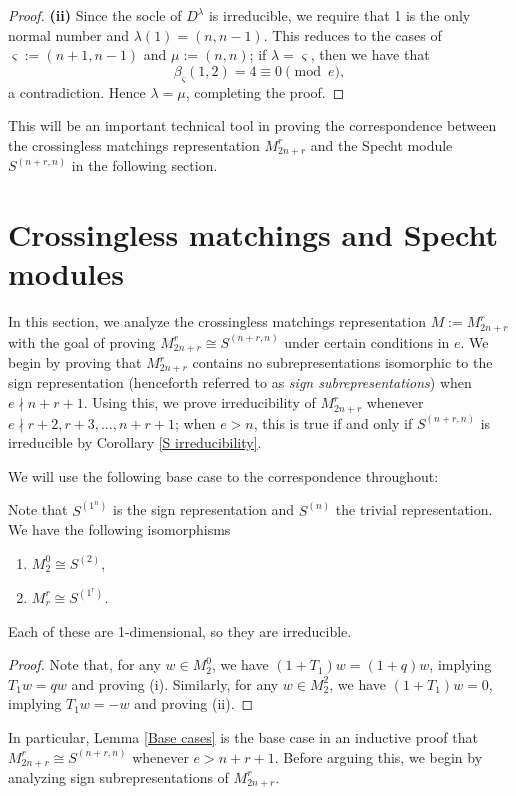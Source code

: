 \documentclass{amsart}
\begin{document}
\begin{proof}
  \textbf{(ii)}
  Since the socle of $D^\lambda$ is irreducible, we require that 1 is the only normal number and $\lambda(1) = (n,n-1)$.
  This reduces to the cases of $\varsigma := (n + 1, n - 1)$ and $\mu := (n,n)$;
  if $\lambda = \varsigma$, then we have that \[\beta_\varsigma(1,2) = 4 \equiv 0 \pmod e,\] a contradiction.
  Hence $\lambda = \mu$, completing the proof.
\end{proof}
This will be an important technical tool in proving the correspondence between the crossingless matchings representation $M_{2n + r}^r$ and the Specht module $S^{(n+r,n)}$ in the following section. 

\section{Crossingless matchings and Specht modules}\label{Crossingless Matchings Section}
In this section, we analyze the crossingless matchings representation $M := M_{2n + r}^r$ with the goal of proving $M_{2n + r}^r \cong S^{(n+r,n)}$ under certain conditions in $e$.
We begin by proving that $M_{2n + r}^r$ contains no subrepresentations isomorphic to the sign representation (henceforth referred to as \emph{sign subrepresentations}) when $e \nmid n + r + 1$.
Using this, we prove irreducibility of $M_{2n + r}^r$ whenever $e \nmid r+2,r+3,\dots,n+r+1$;
when $e>n$, this is true if and only if $S^{(n+r,n)}$ is irreducible by Corollary \ref{S irreducibility}.

We will use the following base case to the correspondence throughout:
\begin{lemma}\label{Base cases}
  Note that $S^{(1^n)}$ is the sign representation and $S^{(n)}$ the trivial representation.
  We have the following isomorphisms
  \begin{enumerate}[label={(\roman*)}]
    \item $M_2^0 \cong S^{(2)}$,
    \item $M_r^r \cong S^{(1^r)}$.
  \end{enumerate}
  Each of these are 1-dimensional, so they are irreducible.
\end{lemma}
\begin{proof}
  Note that, for any $w \in M_2^0$, we have $(1 + T_1)w = (1 + q)w$, implying $T_1w = qw$ and proving (i).
  Similarly, for any $w \in M_2^2$, we have $(1 + T_1)w = 0$, implying $T_1w = -w$ and proving (ii).
\end{proof}
In particular, Lemma \ref{Base cases} is the base case in an inductive proof that $M_{2n + r}^r \cong S^{(n+r,n)}$ whenever $e > n + r + 1$.
Before arguing this, we begin by analyzing sign subrepresentations of $M_{2n + r}^r$.
\end{document}
